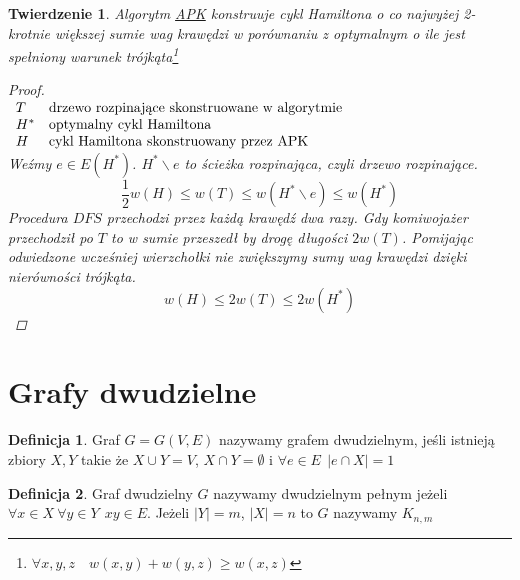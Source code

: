 \documentclass[12pt,a4paper]{article}
\newtheorem{tw}{Twierdzenie}
\theoremstyle{definition}
\newtheorem{df}{Definicja}
\newcommand{\egz}{\marginpar{\color{red} EGZAMIN}} %
\begin{document}
\begin{tw}\egz
Algorytm \hyperref[algo:apk]{APK} konstruuje cykl Hamiltona o co najwyżej 2-krotnie większej sumie wag krawędzi w porównaniu z optymalnym o ile jest spełniony warunek trójkąta\footnote{$\forall x,y,z \quad w(x,y) + w(y,z) \geqslant w(x,z)$}
\begin{proof}~\\
$\begin{array}{l l}
T & \text{drzewo rozpinające skonstruowane w algorytmie}\\
H^* & \text{optymalny cykl Hamiltona}\\
H & \text{cykl Hamiltona skonstruowany przez APK}
\end{array}$\\
Weźmy $e\in E(H^*)$. $H^*\smallsetminus e$ to ścieżka rozpinająca, czyli drzewo rozpinające.
$$ \frac 12w(H) \leqslant w(T) \leqslant w(H^*\smallsetminus e) \leqslant w(H^*) $$
Procedura $DFS$ przechodzi przez każdą krawędź dwa razy. Gdy komiwojażer przechodził po $T$ to w sumie przeszedł by drogę długości $2w(T)$. Pomijając odwiedzone wcześniej wierzchołki nie zwiększymy sumy wag krawędzi dzięki nierówności trójkąta.
$$ w(H) \leqslant 2w(T) \leqslant 2w(H^*) $$
\end{proof}
\end{tw}

\section{Grafy dwudzielne}
\begin{df}
Graf $G=G(V, E)$ nazywamy grafem dwudzielnym, jeśli istnieją zbiory $X, Y$ takie że $X \cup Y = V$, $X \cap Y = \emptyset$ i $\forall e\in E ~~ |e\cap X| = 1$
\end{df}

\begin{df}
Graf dwudzielny $G$ nazywamy dwudzielnym pełnym jeżeli $\forall x\in X ~\forall y\in Y ~~ xy\in E$. Jeżeli $|Y| = m$, $|X| = n$ to $G$ nazywamy $K_{n,m}$
\end{df}
\end{document}
